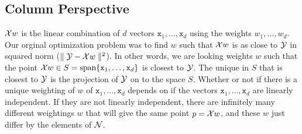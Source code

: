 \subsection{Column Perspective}
$\mathcal X w$ is the linear combination of $d$ vectors $\texttt{x}_1, \dots, \texttt{x}_d$ using the weights  $w_1, \dots,w_d$. Our orginal optimization problem was to find $w$ such that $\mathcal X w$ is as close to $\mathcal Y$ in squared norm ($\parallel \mathcal Y - \mathcal X w \parallel^2$). In other words, we are looking weights $w$ such that the point $\mathcal X w \in S =  \text{span} \{\texttt{x}_1, 
\dots, \texttt{x}_d \}$ is closest to $\mathcal Y$. The unique in $S$ that is closest to $\mathcal Y$ is the projection of $\mathcal Y$ on to the space $S$.  Whether or not if there is a unique weighting of $w$ of $\texttt{x}_1, \dots, \texttt{x}_d$ depends on if the vectors $\texttt{x}_1, \dots, \texttt{x}_d$ are linearly independent. If they are not linearly independent, there are infinitely many different weightings $w$ that will give the same point $p = \mathcal X w$, and these $w$ just differ by the elements of $\mathcal N$. 


